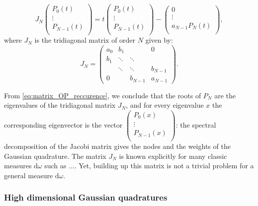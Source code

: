 \documentclass[twoside,11pt]{book}
\begin{document}
\begin{equation}\label{eq:matrix_OP_reccurence}
J_{N} \begin{pmatrix}
P_{0}(t)  \\
\vdots \\
P_{N-1}(t) \\
\end{pmatrix} = t \begin{pmatrix}
P_{0}(t)  \\
\vdots \\
P_{N-1}(t) \\
\end{pmatrix} - \begin{pmatrix}
0  \\
\vdots \\
a_{N-1}P_{N}(t) \\
\end{pmatrix},
\end{equation}
where $J_{N}$ is the tridiagonal matrix of order $N$ given by:
\begin{equation}
J_N = \left( \begin{array}{cccc}
a_{0} & b_{1} & & 0\\
b_{1} & \ddots & \ddots & \\
& \ddots & \ddots & b_{N-1} \\
0 & & b_{N-1} & a_{N-1} \end{array} \right) .
\end{equation}


From \eqref{eq:matrix_OP_reccurence}, we conclude that the roots of $P_{N}$ are the eigenvalues of the tridiagonal matrix $J_{N}$, and for every eigenvalue $x$ the corresponding eigenvector is the vector $\begin{pmatrix}
P_{0}(x)  \\
\vdots \\
P_{N-1}(x) \\
\end{pmatrix}$: the spectral decomposition of the Jacobi matrix gives the nodes and the weights of the Gaussian quadrature. The matrix $J_{N}$ is known explicitly for many classic measures $\mathrm{d}\omega$ such as .... Yet, building up this matrix is not a trivial problem for a general measure $\mathrm{d}\omega$.


\subsubsection{High dimensional Gaussian quadratures}
\end{document}
